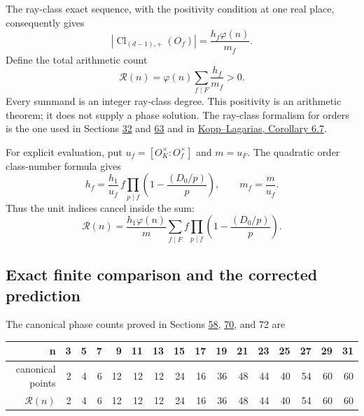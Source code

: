 \documentclass[11pt,reqno]{amsart}
\theoremstyle{plain}
\begin{document}
The ray-class exact sequence, with the positivity condition at
one real place, consequently gives
\begin{equation*}
 \left|\operatorname{Cl}_{(d-1),+}(O_f)\right|
 =\frac{h_f\varphi(n)}{m_f}. \tag{73.1}
\end{equation*}
Define the total arithmetic count
\begin{equation*}
 \boxed{\displaystyle
 \mathcal R(n)=\varphi(n)\sum_{f\mid F}\frac{h_f}{m_f}>0.}
 \tag{73.2}
\end{equation*}
Every summand is an integer ray-class degree. This positivity is
an arithmetic theorem; it does not supply a phase solution.
The ray-class formalism for orders is the one used in Sections
\hyperref[sec:32]{32} and \hyperref[sec:63]{63} and in
\href{https://arxiv.org/html/2212.09177v3\#S6.SS2}{Kopp--Lagarias, Corollary 6.7}.

For explicit evaluation, put
\(u_f=[O_K^\times:O_f^\times]\) and \(m=u_F\). The quadratic
order class-number formula gives
\[
 h_f=\frac{h_1}{u_f}\,f\prod_{p\mid f}
                    \left(1-\frac{(D_0/p)}p\right),
 \qquad m_f=\frac m{u_f}.
\]
Thus the unit indices cancel inside the sum:
\begin{equation*}
 \boxed{\displaystyle
 \mathcal R(n)=\frac{h_1\varphi(n)}m
  \sum_{f\mid F} f\prod_{p\mid f}
                    \left(1-\frac{(D_0/p)}p\right).}
 \tag{73.3}
\end{equation*}

\subsection{Exact finite comparison and the corrected prediction}\label{sec:73.2}

The canonical phase counts proved in Sections \hyperref[sec:58]{58}, \hyperref[sec:70]{70}, and 72 are

\begin{center}\small
\begin{tabular}{@{}rrrrrrrrrrrrrrrr@{}}
\toprule
n & 3 & 5 & 7 & 9 & 11 & 13 & 15 & 17 & 19 & 21 & 23 & 25 & 27 & 29 & 31 \\
\midrule
canonical points & 2 & 4 & 6 & 12 & 12 & 12 & 24 & 16 & 36 & 48 & 44 & 40 & 54 & 60 & 60 \\
\(\mathcal R(n)\) & 2 & 4 & 6 & 12 & 12 & 12 & 24 & 16 & 36 & 48 & 44 & 40 & 54 & 60 & 60 \\
\bottomrule
\end{tabular}
\end{center}
\end{document}
